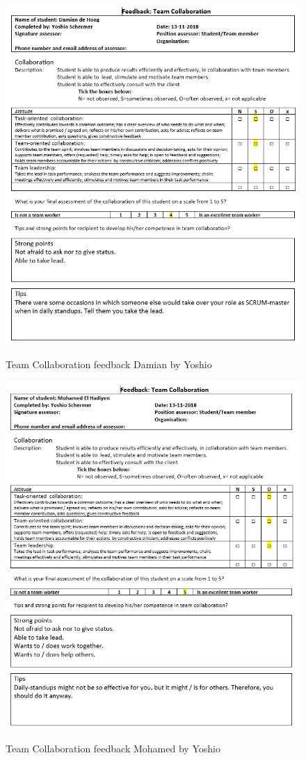 \documentclass[12pt]{article}
\begin{document}
	\begin{figure}[p!]
		\centering
		\includegraphics[width=\columnwidth]{CoopDamian3.PNG}\\
		\caption{Team Collaboration feedback Damian by Yoshio}
	\end{figure}
	\begin{figure}[p!]
		\centering
		\includegraphics[width=\columnwidth]{CoopMohamed3.PNG}\\
		\caption{Team Collaboration feedback Mohamed by Yoshio}
	\end{figure}
\end{document}
